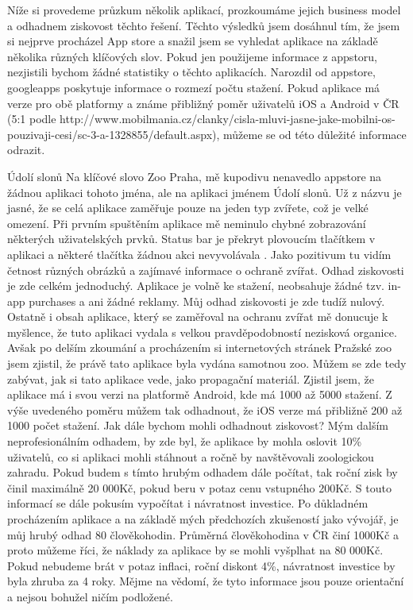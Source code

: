 \documentclass[thesis=B,czech]{FITthesis}[2012/06/26]
\begin{document}
Níže si provedeme průzkum několik aplikací, prozkoumáme jejich business model a odhadnem ziskovost těchto řešení. Těchto výsledků jsem dosáhnul tím, že jsem si nejprve procházel App store a snažil jsem se vyhledat aplikace na základě několika  různých klíčových slov.
Pokud jen použijeme informace z appstoru, nezjistili bychom žádné statistiky o těchto aplikacích. Narozdil od appstore, googleapps poskytuje informace o rozmezí počtu stažení. Pokud aplikace má verze pro obě platformy a známe přibližný poměr uživatelů iOS a Android v ČR (5:1 podle http://www.mobilmania.cz/clanky/cisla-mluvi-jasne-jake-mobilni-os-pouzivaji-cesi/sc-3-a-1328855/default.aspx), můžeme se od této důležité informace odrazit.

Údolí slonů
Na klíčové slovo Zoo Praha, mě kupodivu nenavedlo appstore na žádnou aplikaci tohoto jména, ale na aplikaci jménem Údolí slonů.
Už z názvu je jasné, že se celá aplikace zaměřuje pouze na jeden typ zvířete, což je velké omezení. Při prvním spuštěním aplikace mě neminulo chybné zobrazování některých uživatelských prvků. Status bar je překryt plovoucím tlačítkem v aplikaci a některé tlačítka žádnou akci nevyvolávala . Jako pozitivum tu vidím četnost různých obrázků a zajímavé informace o ochraně zvířat.
Odhad ziskovosti je zde celkém jednoduchý. Aplikace je volně ke stažení, neobsahuje žádné tzv. in-app purchases a ani žádné reklamy. Můj odhad ziskovosti je zde tudíž nulový. Ostatně i obsah aplikace, který se zaměřoval na ochranu zvířat mě donucuje k myšlence, že tuto aplikaci vydala s velkou pravděpodobností nezisková organice.
Avšak po delším zkoumání a procházením si internetových stránek Pražské zoo jsem zjistil, že právě tato aplikace byla vydána samotnou zoo. Můžem se zde tedy zabývat, jak si tato aplikace vede, jako propagační materiál. Zjistil jsem, že aplikace má i svou verzi na platformě Android, kde má 1000 až 5000 stažení. Z výše uvedeného poměru můžem tak odhadnout, že iOS verze má přibližně 200 až 1000 počet stažení. Jak dále bychom mohli odhadnout ziskovost? Mým dalším neprofesionálním odhadem, by zde byl, že aplikace by mohla oslovit 10\% uživatelů, co si aplikaci mohli stáhnout a ročně by navštěvovali zoologickou zahradu. Pokud budem s tímto hrubým odhadem dále počítat, tak roční zisk by činil maximálně 20 000Kč, pokud beru v potaz cenu vstupného 200Kč. S touto informací se dále pokusím vypočítat i návratnost investice. Po důkladném procházením aplikace a na základě mých předchozích zkušeností jako vývojář, je můj hrubý odhad 80 člověkohodin. Průměrná člověkohodina v ČR činí 1000Kč a proto můžeme říci, že náklady za aplikace by se mohli vyšplhat na 80 000Kč. Pokud nebudeme brát v potaz inflaci, roční diskont 4\%, návratnost investice by byla zhruba za 4 roky. Mějme na vědomí, že tyto informace jsou pouze orientační a nejsou bohužel ničím podložené.
\end{document}
